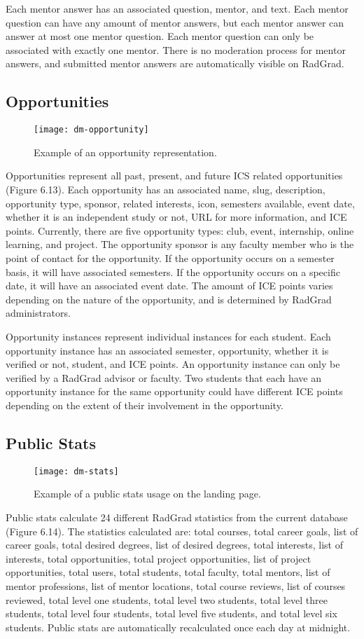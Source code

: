 Each mentor answer has an associated question, mentor, and text. Each mentor question can have any amount of mentor answers, but each mentor answer can answer at most one mentor question. Each mentor question can only be associated with exactly one mentor. There is no moderation process for mentor answers, and submitted mentor answers are automatically visible on RadGrad. 

\subsection{Opportunities}
\begin{figure}[h]
\centering
\texttt{[image: dm-opportunity]}
\caption{Example of an opportunity representation.}
\end{figure}
Opportunities represent all past, present, and future ICS related opportunities (Figure 6.13).  Each opportunity has an associated name, slug, description, opportunity type, sponsor, related interests, icon, semesters available, event date, whether it is an independent study or not, URL for more information, and ICE points. Currently, there are five opportunity types: club, event, internship, online learning, and project. The opportunity sponsor is any faculty member who is the point of contact for the opportunity. If the opportunity occurs on a semester basis, it will have associated semesters. If the opportunity occurs on a specific date, it will have an associated event date. The amount of ICE points varies depending on the nature of the opportunity, and is determined by RadGrad administrators. 

Opportunity instances represent individual instances for each student. Each opportunity instance has an associated semester, opportunity, whether it is verified or not, student, and ICE points. An opportunity instance can only be verified by a RadGrad advisor or faculty. Two students that each have an opportunity instance for the same opportunity could have different ICE points depending on the extent of their involvement in the opportunity.    

\subsection{Public Stats}
\begin{figure}[h]
\centering
\texttt{[image: dm-stats]}
\caption{Example of a public stats usage on the landing page.}
\end{figure}
Public stats calculate 24 different RadGrad statistics from the current database (Figure 6.14). The statistics calculated are: total courses, total career goals, list of career goals, total desired degrees, list of desired degrees, total interests, list of interests, total opportunities, total project opportunities, list of project opportunities, total users, total students, total faculty, total mentors, list of mentor professions, list of mentor locations, total course reviews, list of courses reviewed, total level one students, total level two students, total level three students, total level four students, total level five students, and total level six students. Public stats are automatically recalculated once each day at midnight. 

